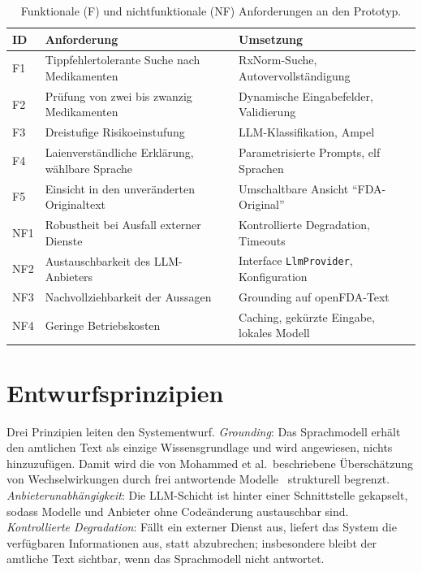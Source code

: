 \begin{table}[htbp]
  \centering
  \small
  \caption{Funktionale (F) und nichtfunktionale (NF) Anforderungen an den Prototyp.}
  \label{tab:anforderungen}
  \begin{tabularx}{\textwidth}{@{}l L L@{}}
    \toprule
    ID & Anforderung & Umsetzung \\
    \midrule
    F1  & Tippfehlertolerante Suche nach Medikamenten & RxNorm-Suche, Autovervollständigung \\
    F2  & Prüfung von zwei bis zwanzig Medikamenten & Dynamische Eingabefelder, Validierung \\
    F3  & Dreistufige Risikoeinstufung & LLM-Klassifikation, Ampel \\
    F4  & Laienverständliche Erklärung, wählbare Sprache & Parametrisierte Prompts, elf Sprachen \\
    F5  & Einsicht in den unveränderten Originaltext & Umschaltbare Ansicht \enquote{FDA-Original} \\
    NF1 & Robustheit bei Ausfall externer Dienste & Kontrollierte Degradation, Timeouts \\
    NF2 & Austauschbarkeit des LLM-Anbieters & Interface \texttt{LlmProvider}, Konfiguration \\
    NF3 & Nachvollziehbarkeit der Aussagen & Grounding auf openFDA-Text \\
    NF4 & Geringe Betriebskosten & Caching, gekürzte Eingabe, lokales Modell \\
    \bottomrule
  \end{tabularx}
\end{table}

\section{Entwurfsprinzipien}

Drei Prinzipien leiten den Systementwurf. \emph{Grounding}: Das Sprachmodell erhält den amtlichen Text als einzige Wissensgrundlage und wird angewiesen, nichts hinzuzufügen. Damit wird die von Mohammed et al.\ beschriebene Überschätzung von Wechselwirkungen durch frei antwortende Modelle~\cite{MOHAMMED2026100733} strukturell begrenzt. \emph{Anbieterunabhängigkeit}: Die LLM-Schicht ist hinter einer Schnittstelle gekapselt, sodass Modelle und Anbieter ohne Codeänderung austauschbar sind. \emph{Kontrollierte Degradation}: Fällt ein externer Dienst aus, liefert das System die verfügbaren Informationen aus, statt abzubrechen; insbesondere bleibt der amtliche Text sichtbar, wenn das Sprachmodell nicht antwortet.

